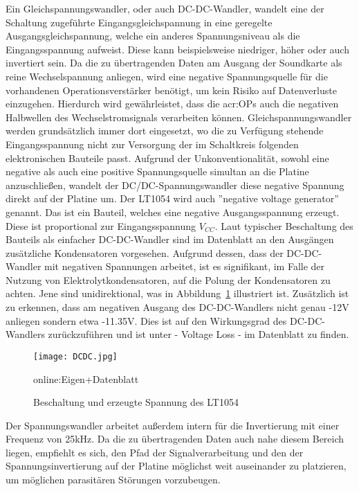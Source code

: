 Ein Gleichspannungswandler, oder auch DC-DC-Wandler, wandelt eine der Schaltung zugeführte Eingangsgleichspannung in eine geregelte Ausgangsgleichspannung, welche ein anderes Spannungsniveau als die Eingangsspannung aufweist. Diese kann beispielsweise niedriger, höher oder auch invertiert sein.
Da die zu übertragenden Daten am Ausgang der Soundkarte als reine Wechselspannung anliegen, wird eine negative Spannungsquelle für die vorhandenen Operationsverstärker benötigt, um kein Risiko auf Datenverluste einzugehen. Hierdurch wird gewährleistet, dass die \gls{acr:OP}s auch die negativen Halbwellen des Wechselstromsignals verarbeiten können.
Gleichspannungswandler werden grundsätzlich immer dort eingesetzt, wo die zu Verfügung stehende Eingangsspannung nicht zur Versorgung der im Schaltkreis folgenden elektronischen Bauteile passt.\cite{abc} Aufgrund der Unkonventionalität, sowohl eine negative als auch eine positive Spannungsquelle simultan an die Platine anzuschließen, wandelt der DC/DC-Spannungswandler diese negative Spannung direkt auf der Platine um. Der LT1054 wird auch ”negative voltage generator” genannt. Das ist ein Bauteil, welches eine negative Ausgangsspannung erzeugt. Diese ist proportional zur Eingangsspannung $V_{CC}$. Laut typischer Beschaltung des Bauteils als einfacher DC-DC-Wandler sind im Datenblatt an den Ausgängen zusätzliche Kondensatoren vorgesehen. Aufgrund dessen, dass der DC-DC-Wandler mit negativen Spannungen arbeitet, ist es signifikant, im Falle der Nutzung von Elektrolytkondensatoren, auf die Polung der Kondensatoren zu achten. Jene sind unidirektional, was in Abbildung~\ref{fig:DCDC} illustriert ist. Zusätzlich ist zu erkennen, dass am negativen Ausgang des DC-DC-Wandlers nicht genau -12V anliegen sondern etwa -11.35V. Dies ist auf den Wirkungsgrad des DC-DC-Wandlers zurückzuführen und ist unter - Voltage Loss - im Datenblatt zu finden. 

\begin{figure}[H]
	\centering
	\texttt{[image: DCDC.jpg]}
	\caption[Beschaltung und erzeugte Spannung des LT1054]{Beschaltung und erzeugte Spannung des LT1054} 
	\gls{online:Eigen}+Datenblatt
	\label{fig:DCDC}
\end{figure}

Der Spannungswandler arbeitet außerdem intern für die Invertierung mit einer Frequenz von 25kHz. Da die zu übertragenden Daten auch nahe diesem Bereich liegen, empfiehlt es sich, den Pfad der Signalverarbeitung und den der Spannungsinvertierung auf der Platine möglichst weit auseinander zu platzieren, um möglichen parasitären Störungen vorzubeugen.


